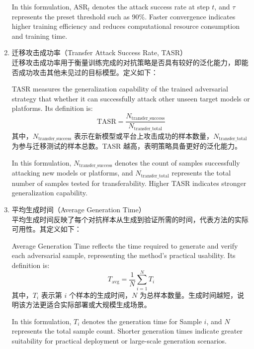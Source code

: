 \begin{enumerate}[label=\arabic*)]
    In this formulation, $\text{ASR}_t$ denotes the attack success rate at step $t$, and $\tau$ represents the preset threshold such as 90\%. Faster convergence indicates higher training efficiency and reduces computational resource consumption and training time.
	
	\item 迁移攻击成功率（Transfer Attack Success Rate, TASR）\\
	迁移攻击成功率用于衡量训练完成的对抗策略是否具有较好的泛化能力，即能否成功攻击其他未见过的目标模型。定义如下：

    TASR measures the generalization capability of the trained adversarial strategy that whether it can successfully attack other unseen target models or platforms. Its definition is:
	\begin{equation}
		\text{TASR} = \frac{N_{\text{transfer\_success}}}{N_{\text{transfer\_total}}}
		\tag{5.7}
	\end{equation}
	其中，$N_{\text{transfer\_success}}$ 表示在新模型或平台上攻击成功的样本数量，$N_{\text{transfer\_total}}$ 为参与迁移测试的样本总数。TASR 越高，表明策略具备更好的泛化能力。

    In this formulation, $N_{\text{transfer\_success}}$ denotes the count of samples successfully attacking new models or platforms, and $N_{\text{transfer\_total}}$ represents the total number of samples tested for transferability. Higher TASR indicates stronger generalization capability.
	
	\item 平均生成时间（Average Generation Time）\\
	平均生成时间反映了每个对抗样本从生成到验证所需的时间，代表方法的实际可用性。其定义如下：

    Average Generation Time reflects the time required to generate and verify each adversarial sample, representing the method's practical usability. Its definition is:
	\begin{equation}
		T_{\text{avg}} = \frac{1}{N} \sum_{i=1}^{N} T_i
		\tag{5.8}
	\end{equation}
	其中，$T_i$ 表示第 $i$ 个样本的生成时间，$N$ 为总样本数量。生成时间越短，说明该方法更适合实际部署或大规模生成场景。

    In this formulation, $T_i$ denotes the generation time for Sample $i$, and $N$ represents the total sample count. Shorter generation times indicate greater suitability for practical deployment or large-scale generation scenarios.
\end{enumerate}

